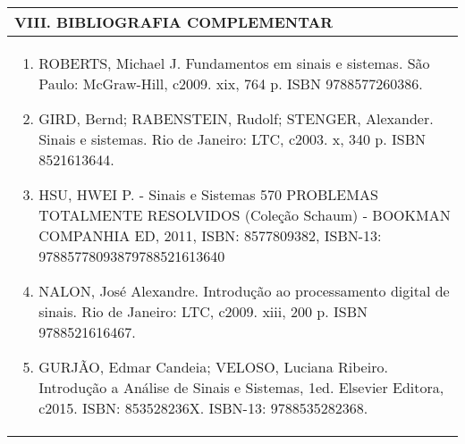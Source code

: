 \documentclass[12pt]{article}
\begin{document}

\begin{longtable}{|L{1.025\textwidth}|} \hline
%
{\bf VIII. BIBLIOGRAFIA COMPLEMENTAR} \\ \hline
\begin{enumerate}
\item ROBERTS, Michael J. Fundamentos em sinais e sistemas. São Paulo: McGraw-Hill, c2009. xix, 764 p. ISBN 9788577260386.
\item GIRD, Bernd; RABENSTEIN, Rudolf; STENGER, Alexander. Sinais e sistemas. Rio de Janeiro: LTC, c2003. x, 340 p. ISBN 8521613644.
\item HSU, HWEI P. - Sinais e Sistemas 570 PROBLEMAS TOTALMENTE RESOLVIDOS (Coleção Schaum) - BOOKMAN COMPANHIA ED, 2011, ISBN: 8577809382, ISBN-13: 97885778093879788521613640
\item NALON, José Alexandre. Introdução ao processamento digital de sinais. Rio de Janeiro: LTC, c2009. xiii, 200 p. ISBN 9788521616467.
\item GURJÃO, Edmar Candeia; VELOSO, Luciana Ribeiro. Introdução a Análise de Sinais e Sistemas, 1ed. Elsevier Editora, c2015. ISBN: 853528236X. ISBN-13: 9788535282368.
\end{enumerate}
 \\ \hline
\end{longtable}



\end{document}
